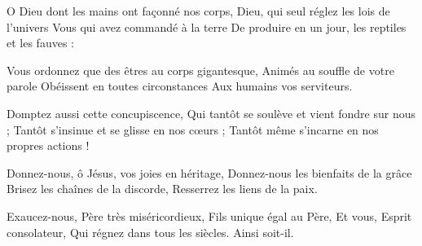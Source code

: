 O Dieu dont les mains ont façonné nos corps,
Dieu, qui seul réglez les lois de l'univers
Vous qui avez commandé à la terre
De produire en un jour, les reptiles et les fauves :

Vous ordonnez que des êtres au corps gigantesque,
Animés au souffle de votre parole
Obéissent en toutes circonstances
Aux humains vos serviteurs.

Domptez aussi cette concupiscence,
Qui tantôt se soulève et vient fondre sur nous ;
Tantôt s'insinue et se glisse en nos cœurs ;
Tantôt même s'incarne en nos propres actions !

Donnez-nous, ô Jésus, vos joies en héritage,
Donnez-nous les bienfaits de la grâce
Brisez les chaînes de la discorde,
Resserrez les liens de la paix.

Exaucez-nous, Père très miséricordieux,
Fils unique égal au Père,
Et vous, Esprit consolateur,
Qui régnez dans tous les siècles.
Ainsi soit-il.
